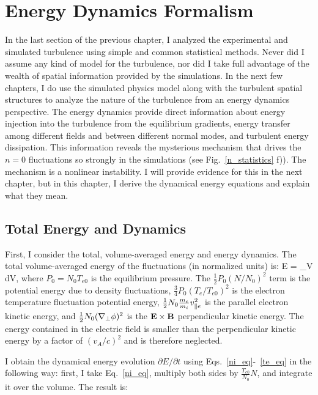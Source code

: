 \chapter{Energy Dynamics Formalism}
\label{c_en_formalism}

In the last section of the previous chapter, I analyzed the experimental and simulated turbulence using simple and common statistical methods. Never did I assume any kind of model for the turbulence,
nor did I take full advantage of the wealth of spatial information provided by the simulations. In the next few chapters, I do use the simulated physics model along with the turbulent spatial
structures to analyze the nature of the turbulence from an energy dynamics perspective. The energy dynamics provide direct information about energy injection into the turbulence from the equilibrium
gradients, energy transfer among different fields and between different normal modes, and turbulent energy dissipation. This information reveals the mysterious mechanism that
drives the $n=0$ fluctuations so strongly in the simulations (see Fig.~\ref{n_statistics} f)). The mechanism is a nonlinear instability. I will provide evidence
for this in the next chapter, but in this chapter, I derive the dynamical energy equations and explain what they mean.

\section{Total Energy and Dynamics}
\label{s_tot_en_dyn}

First, I consider the total, volume-averaged energy and energy dynamics. The total volume-averaged energy of the fluctuations (in normalized units) is:
\beq
\label{tot_energy}
E =  \int_V   dV,
\eeq
where $P_0 = N_0 T_{e0}$ is the equilibrium pressure.
The $\frac{1}{2} P_0 (N/N_0)^2$ term is the potential energy due to density fluctuations, $\frac{3}{4} P_0 (T_e/T_{e0})^2$ is the electron temperature fluctuation potential energy,
$\frac{1}{2} N_0 \frac{m_e}{m_i} v_{\parallel e}^2$ is the parallel electron kinetic energy, and $\frac{1}{2} N_0 (\nabla_\perp \phi)^2$ is the ${\bf E \times B}$ perpendicular kinetic energy.
The energy contained in the electric field is smaller than the perpendicular kinetic energy by a factor of $(v_A/c)^2$ and is therefore neglected.

I obtain the dynamical energy evolution $\partial E/\partial t$ using Eqs.~\ref{ni_eq}-~\ref{te_eq} in the following way: 
first, I take Eq.~\ref{ni_eq}, multiply both sides by $\frac{T_{e0}}{N_0} N$, and integrate it over the volume.
The result is:

